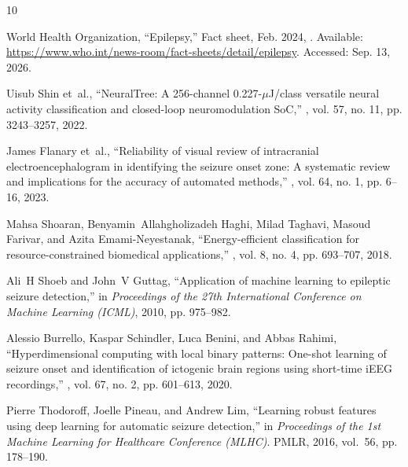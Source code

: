 \documentclass[letterpaper]{article}
\begin{document}
\begin{thebibliography}{10}
\setlength{\itemsep}{0pt}
\setlength{\parsep}{0pt}

{World Health Organization},
\newblock ``Epilepsy,'' Fact sheet, Feb. 2024,
\newblock [Online]. Available:
  \url{https://www.who.int/news-room/fact-sheets/detail/epilepsy}. Accessed:
  Sep. 13, 2026.

Uisub Shin et~al.,
\newblock ``{NeuralTree}: A 256-channel 0.227-$\mu$J/class versatile neural
  activity classification and closed-loop neuromodulation {SoC},''
, vol. 57, no. 11, pp.
  3243--3257, 2022.

James Flanary et~al.,
\newblock ``Reliability of visual review of intracranial electroencephalogram
  in identifying the seizure onset zone: A systematic review and implications
  for the accuracy of automated methods,''
, vol. 64, no. 1, pp. 6--16, 2023.

Mahsa Shoaran, Benyamin~Allahgholizadeh Haghi, Milad Taghavi, Masoud Farivar,
  and Azita Emami-Neyestanak,
\newblock ``Energy-efficient classification for resource-constrained biomedical
  applications,''
, vol. 8, no. 4, pp. 693--707, 2018.

Ali~H Shoeb and John~V Guttag,
\newblock ``Application of machine learning to epileptic seizure detection,''
\newblock in {\em Proceedings of the 27th International Conference on Machine
  Learning (ICML)}, 2010, pp. 975--982.

Alessio Burrello, Kaspar Schindler, Luca Benini, and Abbas Rahimi,
\newblock ``Hyperdimensional computing with local binary patterns: One-shot
  learning of seizure onset and identification of ictogenic brain regions using
  short-time {iEEG} recordings,''
, vol. 67, no. 2,
  pp. 601--613, 2020.

Pierre Thodoroff, Joelle Pineau, and Andrew Lim,
\newblock ``Learning robust features using deep learning for automatic seizure
  detection,''
\newblock in {\em Proceedings of the 1st Machine Learning for Healthcare
  Conference (MLHC)}. PMLR, 2016, vol.~56, pp. 178--190.


\end{thebibliography}
\end{document}
